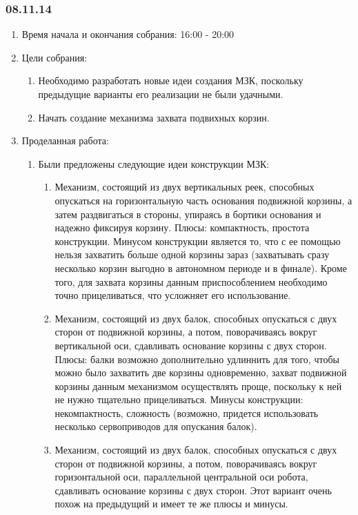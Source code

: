 
\subsubsection{08.11.14}

\begin{enumerate}
	\item Время начала и окончания собрания:
	16:00 - 20:00
	\item Цели собрания:
	\begin{enumerate}
		\item Необходимо разработать новые идеи создания МЗК, поскольку предыдущие варианты его реализации не были удачными.
		
		\item Начать создание механизма захвата подвихных корзин.
		
	\end{enumerate}
	
	\item Проделанная работа:
	\begin{enumerate}
		\item Были предложены следующие идеи конструкции МЗК:
		\begin{enumerate}
			\item Механизм, состоящий из двух вертикальных реек, способных опускаться на горизонтальную часть основания подвижной корзины, а затем раздвигаться в стороны, упираясь в бортики основания и надежно фиксируя корзину. Плюсы: компактность, простота конструкции. Минусом конструкции является то, что с ее помощью нельзя захватить больше одной корзины зараз (захватывать сразу несколько корзин выгодно в автономном периоде и в финале). Кроме того, для захвата корзины данным приспособлением необходимо точно прицеливаться, что усложняет его использование.
			
			\item Механизм, состоящий из двух балок, способных опускаться с двух сторон от подвижной корзины, а потом, поворачиваясь вокруг вертикальной оси, сдавливать основание корзины с двух сторон. Плюсы: балки возможно дополнительно удлиннить для того, чтобы можно было захватить две корзины одновременно, захват подвижной корзины данным механизмом осуществлять проще, поскольку к ней не нужно тщательно прицеливаться. Минусы конструкции: некомпактность, сложность (возможно, придется использовать несколько сервоприводов для опускания балок).
			
			\item Механизм, состоящий из двух балок, способных опускаться с двух сторон от подвижной корзины, а потом, поворачиваясь вокруг горизонтальной оси, параллельной центральной оси робота, сдавливать основание корзины с двух сторон. Этот вариант очень похож на предыдущий и имеет те же плюсы и минусы.
			

\end{enumerate}
\end{enumerate}
\end{enumerate}
